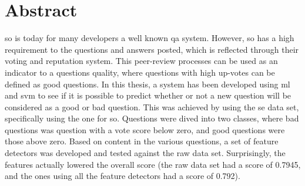 \chapter*{Abstract}
\gls{so} is today for many developers a well known \gls{qa} system. 
However, \gls{so} has a high requirement to the questions and answers posted, which is reflected through their voting and reputation system. 
This peer-review processes can be used as an indicator to a questions quality, where questions with high up-votes can be defined as good questions.
In this thesis, a system has been developed using  \gls{ml} and \gls{svm} to see if it is possible to predict whether or not a new question will be 
considered as a good or bad question. 
\vspace{0.5em}\newline
This was achieved by using the \gls{se} data set, specifically using the one for \gls{so}. 
Questions were dived into two classes, where bad questions was question with a vote score below zero, and good questions were those above zero. 
Based on content in the various questions, a set of feature detectors was developed and tested against the raw data set. 
Surprisingly, the features actually lowered the overall score (the raw data set had a score of 0.7945, and the ones using all the feature detectors had a score of 0.792). \\


